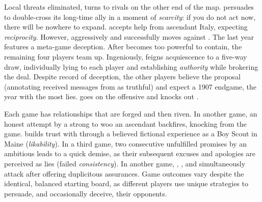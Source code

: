 Local threats eliminated,  turns to rivals on the other
end of the map.
%
 persuades  to double-cross its
long-time ally  in a moment of \textit{scarcity}: if
you do not act now, there will be nowhere to expand.
%
 accepts help from ascendant Italy, expecting
\textit{reciprocity}.
%
However,  aggressively and successfully moves against
.
%
The last year features a meta-game deception.
%
After  becomes too powerful to contain, the remaining four
players team up.
%
Ingeniously,  feigns acquiescence to a five-way draw,
individually lying to each player and establishing \textit{authority}
while brokering the deal.
%
Despite  record of deception, the other players believe the
proposal (annotating received messages from  as truthful) and
expect a 1907 endgame, the year with the most lies.
%
  goes on the offensive and knocks out .
%



Each game has relationships that are forged and then riven.
%
In another game, an honest attempt by a strong  to woo an
ascendant  backfires, knocking  from the game.
%
 builds trust with  through a believed
fictional experience as a Boy Scout in Maine (\textit{likability}).
%
In a third game, two consecutive unfulfilled promises by an ambitious
 leads to a quick demise, as their subsequent excuses
and apologies are perceived as lies (failed \textit{consistency}).
%
In another game, , , and
 simultaneously attack  after offering
duplicitous assurances.
%
Game outcomes vary despite the identical, balanced starting board, as
different players use unique strategies to persuade, and occasionally
deceive, their opponents.
  
